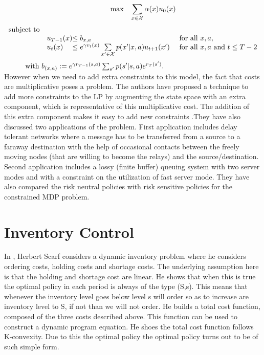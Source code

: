 \documentclass[11pt,a4paper,oneside]{report}
\begin{document}
\begin{equation}
\hspace{1cm}\text{max    }   \hspace{0.2cm}\sum\limits_{x\in\cal{X}}\alpha(x)u_0(x)
\end{equation}
\begin{equation*}
\begin{array}{ll@{}ll}
\text{subject to}& \\
&u_{T-1}(x)&\leq b_{x,a}                                                             &\text{ for all } x,a,\\
&u_t(x)&\leq e^{\gamma v_t(x)}\sum\limits_{x'\in \cal{X}} p(x'|x,a)u_{t+1}(x')   &\text{ for all } x,a \text{ and } t\leq T-2
\end{array}
\end{equation*}
$\hspace{0.9cm}\text{ with } b_{(x,a)}:= e^{\gamma r_{T-1}(s,a)}\sum_{s'} p(s'|s,a)e^{r_T(s')}.$\\
However when we need to add extra constraints to this model, the fact that costs are multiplicative poses a problem. The authors have proposed a technique to add more constraints to the LP by augmenting the state space with an extra component, which is representative of this multiplicative cost. The addition of this extra component makes it easy to add new constraints .They have also discussed two applications of the problem. First application includes delay tolerant networks where a message has to be transferred from a source to a faraway destination with the help of occasional contacts between the freely moving nodes (that are willing to become the relays) and the source/destination. Second application includes a lossy (finite buffer) queuing system with two server modes and with a constraint on the utilization of fast server mode. They have also compared the risk neutral policies with risk sensitive policies for the constrained MDP problem.\\

\section{Inventory Control}
In \cite{scarf1959optimality}, Herbert Scarf considers a dynamic inventory problem where he considers ordering costs, holding costs and shortage costs. The underlying assumption here is that the holding and shortage cost are linear. He shows that when this is true the optimal policy in each period is always of the type (S,s). This means that whenever the inventory level goes below level s will order so as to increase are inventory level to S, if not than we will not order. He builds a total cost function, composed of the three costs described above. This function can be used to construct a dynamic program equation. He shoes the total cost function follows K-convexity. Due to this the optimal policy the optimal policy turns out to be of such simple form.\\
\end{document}
